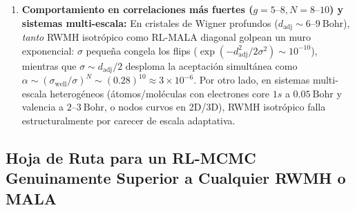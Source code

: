 \documentclass[10pt,a4paper]{article}
\begin{document}
\begin{enumerate}
\begin{itemize}
  \item \textit{Asignación de crédito multi-agente ($1/N$):} \texttt{TD3Learner1D.push\_transitions} replica la misma recompensa escalar global de los $N$ electrones a cada electrón individual mientras el crítico solo observa $(s_i, a_i)$, diluyendo la señal local de $F_{Q,i}$ como $1/N$.
  \item \textit{Homogeneidad del cristal 1D + sesgo de CDLB:} todos los pozos de Wigner tienen anchura similar ($\sigma_{\mathrm{well}}\approx 1.4\ \mathrm{Bohr}$) y CDLB ($-\alpha\log q \propto \alpha N \ln\sigma$) empuja monotónicamente $\sigma \to \sigma_{\max}$.
  \end{itemize}
\item \textbf{Comportamiento en correlaciones más fuertes ($g=5\text{–}8, N=8\text{–}10$) y sistemas multi-escala:} En cristales de Wigner profundos ($d_{\mathrm{adj}} \sim 6\text{–}9\ \mathrm{Bohr}$), \emph{tanto} RWMH isotrópico como RL-MALA diagonal golpean un muro exponencial: $\sigma$ pequeña congela los flips ($\exp(-d_{\mathrm{adj}}^2/2\sigma^2) \sim 10^{-10}$), mientras que $\sigma \sim d_{\mathrm{adj}}/2$ desploma la aceptación simultánea como $\alpha \sim (\sigma_{\mathrm{well}}/\sigma)^N \sim (0.28)^{10} \approx 3\times 10^{-6}$. Por otro lado, en sistemas multi-escala heterogéneos (átomos/moléculas con electrones core $1s$ a $0.05\ \mathrm{Bohr}$ y valencia a $2\text{–}3\ \mathrm{Bohr}$, o nodos curvos en 2D/3D), RWMH isotrópico falla estructuralmente por carecer de escala adaptativa.
\end{enumerate}

\subsection{Hoja de Ruta para un RL-MCMC Genuinamente Superior a Cualquier RWMH o MALA}
\end{document}
